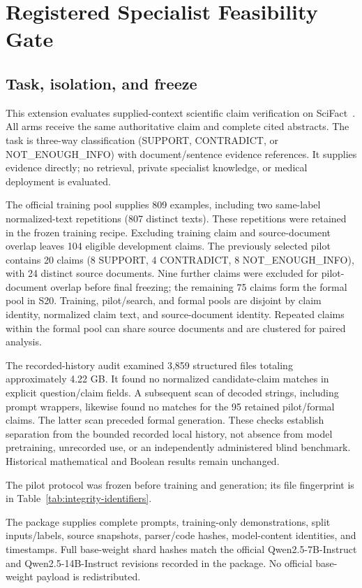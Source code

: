 \documentclass[journal,onecolumn]{IEEEtran}
\begin{document}
\section{Registered Specialist Feasibility Gate}
\label{sec:s19}
\label{sec:specialist-pilot}
\subsection{Task, isolation, and freeze}
This extension evaluates supplied-context scientific claim verification on SciFact~\cite{wadden2020scifact}. All arms receive the same authoritative claim and complete cited abstracts. The task is three-way classification (SUPPORT, CONTRADICT, or NOT\_ENOUGH\_INFO) with document/sentence evidence references. It supplies evidence directly; no retrieval, private specialist knowledge, or medical deployment is evaluated.

The official training pool supplies 809 examples, including two same-label normalized-text repetitions (807 distinct texts). These repetitions were retained in the frozen training recipe. Excluding training claim and source-document overlap leaves 104 eligible development claims. The previously selected pilot contains 20 claims (8 SUPPORT, 4 CONTRADICT, 8 NOT\_ENOUGH\_INFO), with 24 distinct source documents. Nine further claims were excluded for pilot-document overlap before final freezing; the remaining 75 claims form the formal pool in S20. Training, pilot/search, and formal pools are disjoint by claim identity, normalized claim text, and source-document identity. Repeated claims within the formal pool can share source documents and are clustered for paired analysis.

The recorded-history audit examined 3,859 structured files totaling approximately 4.22 GB. It found no normalized candidate-claim matches in explicit question/claim fields. A subsequent scan of decoded strings, including prompt wrappers, likewise found no matches for the 95 retained pilot/formal claims. The latter scan preceded formal generation. These checks establish separation from the bounded recorded local history, not absence from model pretraining, unrecorded use, or an independently administered blind benchmark. Historical mathematical and Boolean results remain unchanged.

The pilot protocol was frozen before training and generation; its file fingerprint is in Table~\ref{tab:integrity-identifiers}.

The package supplies complete prompts, training-only demonstrations, split inputs/labels, source snapshots, parser/code hashes, model-content identities, and timestamps. Full base-weight shard hashes match the official Qwen2.5-7B-Instruct and Qwen2.5-14B-Instruct revisions recorded in the package. No official base-weight payload is redistributed.
\end{document}
